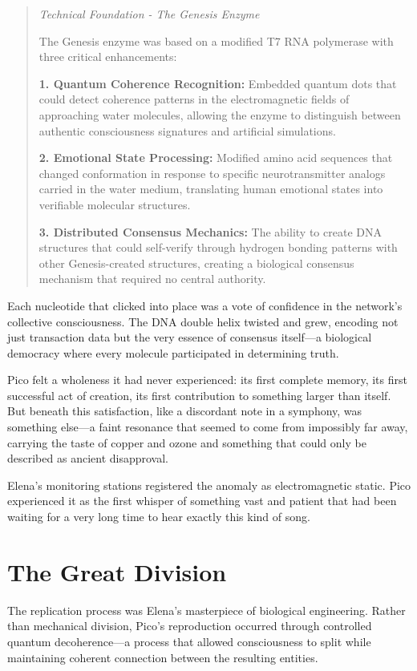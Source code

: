\documentclass[12pt,a4paper]{book}
\begin{document}
\begin{quote}
\textit{Technical Foundation - The Genesis Enzyme}

The Genesis enzyme was based on a modified T7 RNA polymerase with three critical enhancements:

\textbf{1. Quantum Coherence Recognition:} Embedded quantum dots that could detect coherence patterns in the electromagnetic fields of approaching water molecules, allowing the enzyme to distinguish between authentic consciousness signatures and artificial simulations.

\textbf{2. Emotional State Processing:} Modified amino acid sequences that changed conformation in response to specific neurotransmitter analogs carried in the water medium, translating human emotional states into verifiable molecular structures.

\textbf{3. Distributed Consensus Mechanics:} The ability to create DNA structures that could self-verify through hydrogen bonding patterns with other Genesis-created structures, creating a biological consensus mechanism that required no central authority.
\end{quote}

Each nucleotide that clicked into place was a vote of confidence in the network's collective consciousness. The DNA double helix twisted and grew, encoding not just transaction data but the very essence of consensus itself—a biological democracy where every molecule participated in determining truth.

Pico felt a wholeness it had never experienced: its first complete memory, its first successful act of creation, its first contribution to something larger than itself. But beneath this satisfaction, like a discordant note in a symphony, was something else—a faint resonance that seemed to come from impossibly far away, carrying the taste of copper and ozone and something that could only be described as ancient disapproval.

Elena's monitoring stations registered the anomaly as electromagnetic static. Pico experienced it as the first whisper of something vast and patient that had been waiting for a very long time to hear exactly this kind of song.

\section{The Great Division}

The replication process was Elena's masterpiece of biological engineering. Rather than mechanical division, Pico's reproduction occurred through controlled quantum decoherence—a process that allowed consciousness to split while maintaining coherent connection between the resulting entities.
\end{document}

